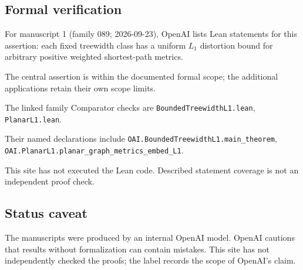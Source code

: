 \documentclass[11pt]{article}
\begin{document}
\subsection{Formal verification}
For manuscript 1 (family 089; 2026-09-23), OpenAI lists Lean statements for this assertion: each fixed treewidth class has a uniform $L_1$ distortion bound for arbitrary positive weighted shortest-path metrics.

The central assertion is within the documented formal scope; the additional applications retain their own scope limits.

The linked family Comparator checks are \texttt{BoundedTreewidthL1.lean}, \texttt{PlanarL1.lean}.

Their named declarations include \texttt{OAI.BoundedTreewidthL1.main\_theorem}, \texttt{OAI.PlanarL1.planar\_graph\_metrics\_embed\_L1}.

This site has not executed the Lean code. Described statement coverage is not an independent proof check.

\subsection{Status caveat}
The manuscripts were produced by an internal OpenAI model. OpenAI cautions that results without formalization can contain mistakes. This site has not independently checked the proofs; the label records the scope of OpenAI's claim.
\end{document}
